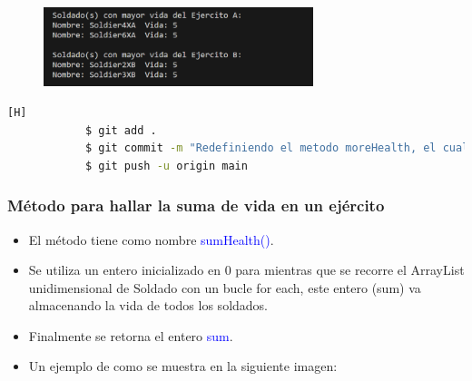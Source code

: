 \documentclass{article}
\begin{document}
        \begin{figure}[H]
            \centering
            \includegraphics[width=0.7\textwidth,keepaspectratio]{img/moreHealth.png}
            \caption{}
        \end{figure}

        \begin{lstlisting}[language=bash,caption={Commit \href{https://github.com/hernanchoquehuanca/fp2-23b/commit/ba455c468a7dbaa2b26c2391aac7c93c0020d5f6}{ba455c4}: Se agregó el método moreHealt() que imprimirá aquellos soldados que tengan la mayor vida dentro de su ejército}][H]
    		$ git add .
    		$ git commit -m "Redefiniendo el metodo moreHealth, el cual mostrara aquellos soldados o soldado con mas vida dentro del ejercito que reciba como parametro"
    		$ git push -u origin main
    	\end{lstlisting}
        
        
        \subsubsection{Método para hallar la suma de vida en un ejército}

        \begin{itemize}
            \item El método tiene como nombre \textcolor{blue}{sumHealth()}.
            \item Se utiliza un entero inicializado en 0 para mientras que se recorre el ArrayList unidimensional de Soldado con un bucle for each, este entero (sum) va almacenando la vida de todos los soldados.
            \item Finalmente se retorna el entero \textcolor{blue}{sum}.
        \end{itemize}

        
        \newpage
        \begin{itemize}
            \begin{itemize}
                \item Un ejemplo de como se muestra en la siguiente imagen:
            \end{itemize}
        \end{itemize}
\end{document}
